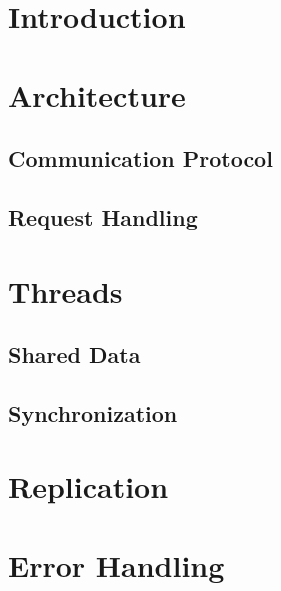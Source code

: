\documentclass[a4paper, titlepage, portuguese]{article}
\begin{document}
	\section{Introduction}

	\section{Architecture}
	\subsection{Communication Protocol}
	\subsection{Request Handling}

	\section{Threads}
	\subsection{Shared Data}
	\subsection{Synchronization}

	\section{Replication}

	\section{Error Handling}



\end{document}
